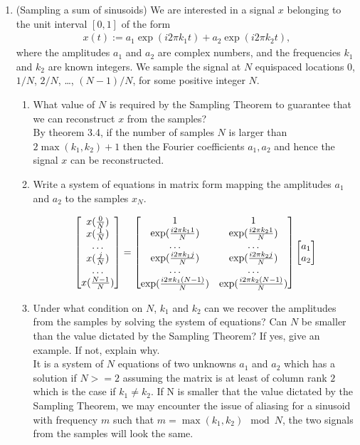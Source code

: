 \documentclass[12pt,twoside]{article}
\begin{document}
\begin{enumerate}
\newpage

\item (Sampling a sum of sinusoids) We are interested in a signal $x$ belonging to the unit interval $[0,1]$ of the form
\begin{align}
x(t) := a_1 \exp (i 2 \pi k_1 t ) + a_2 \exp (i 2 \pi k_2 t ),
\end{align}
where the amplitudes $a_1$ and $a_2$ are complex numbers, and the
frequencies $k_1$ and $k_2$ are known integers.
We sample the signal at $N$ equispaced locations $0$, $1/N$, $2/N$,
\ldots, $(N-1)/N$, for some positive integer $N$.  
\begin{enumerate}
\item What value of $N$ is required by the Sampling Theorem to
  guarantee that we can reconstruct $x$ from the samples? \\
  
 By theorem 3.4, if the number of samples $N$ is larger than $2 \max{(k_1, k_2)} + 1$ then  the Fourier coefficients $a_1,  a_2$ and hence the signal $x$ can
 be reconstructed. 
 
\item Write a system of equations in matrix form mapping the
  amplitudes $a_1$ and $a_2$ to the samples $x_{N}$. 
  
  $$\begin{bmatrix} x(\frac{0}{N}) \\ x(\frac{1}{N}) \\ \ldots \\ x(\frac{j}{N}) \\ \ldots\\ x(\frac{N-1}{N})  \end{bmatrix} 
  	= \begin{bmatrix} 1  & 1 \\  \exp (\frac{i 2 \pi k_1 1} {N} ) & \exp (\frac{i 2 \pi k_2 1} {N} )
	 \\ \ldots &  \ldots \\    \exp (\frac{i 2 \pi k_1 j} {N} ) & \exp (\frac{i 2 \pi k_2 j} {N} ) 
	 \\  \ldots &  \ldots \\    \exp (\frac{i 2 \pi k_1 (N-1)} {N} ) & \exp (\frac{i 2 \pi k_2 (N-1)} {N} )  \end{bmatrix}
	 \begin{bmatrix} a_1 \\ a_2  \end{bmatrix}$$
  
  \item Under what condition on $N$, $k_1$ and $k_2$ can we recover the
  amplitudes from the samples by solving the system of equations? 
  Can $N$ be smaller than the value dictated by the Sampling Theorem?
  If yes, give an example. If not, explain why.  \\
  It is a system of $N$ equations of two unknowns $a_1$ and $a_2$ which has a solution if $N > = 2$ assuming the matrix is at least of column rank $2$ which is
  the case if $k_1 \neq k_2$. If N is smaller that the value dictated by the Sampling Theorem, we may encounter the issue of aliasing for a sinusoid with frequency $m$ such that $m =  \max{(k_1, k_2)} \mod N$,
  the two signals from the samples will look the same.
  

\end{enumerate}
\end{enumerate}
\end{document}
